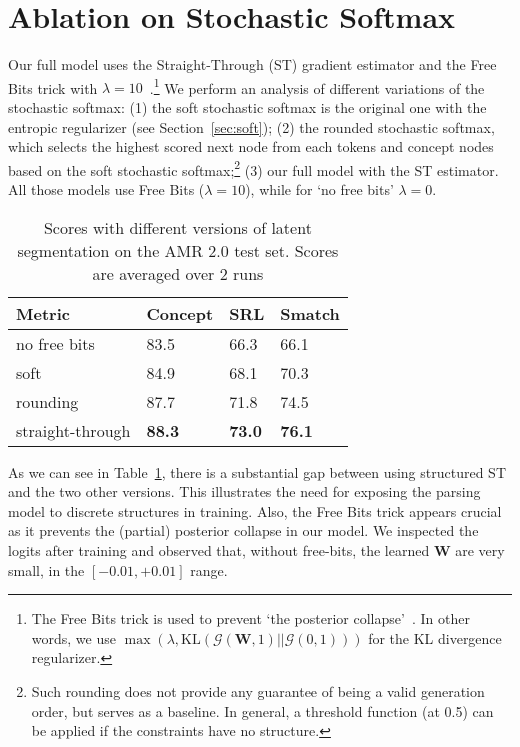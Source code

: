 \documentclass[11pt]{article}
\begin{document}
\section{Ablation on Stochastic Softmax}
Our full model uses the Straight-Through (ST) gradient estimator and the Free Bits trick with $\lambda=10$~\cite{Kingma2017ImprovedVI}.\footnote{The Free Bits trick is used to prevent `the posterior collapse'~\cite{Kingma2017ImprovedVI}. In other words, we use $\max (\lambda, \mathrm{KL}(\mathcal{G}(  \mathbf{W},1)||\mathcal{G}(0,1)) )$ for the KL divergence regularizer.} 
We perform an analysis of different variations of the stochastic softmax:  (1)  the soft stochastic softmax is the original one with the entropic regularizer (see Section~\ref{sec:soft});  (2) the rounded stochastic softmax, which selects the highest scored next node from each tokens and concept nodes based on the soft stochastic softmax;\footnote{Such rounding does not provide any guarantee of being a valid generation order, but serves as a baseline. In general, a threshold function (at 0.5) can be applied if the constraints have no structure.} (3) our full model with the ST estimator.  All those models use Free Bits ($\lambda=10$),  while for `no free bits' $\lambda=0$. 
\begin{table}[t!] 
    \begin{center} 
        \begin{tabular}{llll} 
            \hline  Metric   &   Concept & SRL &  Smatch \\\hline
   no free bits  &  83.5  & 66.3 &  66.1 \\ 
           soft    & 84.9 & 68.1& 70.3\\
          rounding     & 87.7  &71.8& 74.5\\
          straight-through     &\bf  88.3 &\bf 73.0&\bf 76.1\\ \hline
        \end{tabular}
    \end{center}
    \vspace{-2ex}
	\caption{\label{table:ablation_ss} Scores with different versions of latent segmentation on the AMR 2.0 test set. Scores are averaged over 2 runs
    }
\end{table}
As we can see in Table~\ref{table:ablation_ss},  there is a substantial gap between using structured ST and the two other versions. This illustrates the need for exposing the parsing model to discrete structures in training. Also, the Free Bits trick appears crucial as it prevents the (partial) posterior collapse in our model. We inspected the logits after training and observed that, without free-bits, the learned $\mathbf{W}$ are very small, in the $[-0.01,+0.01]$ range.   
\end{document}
